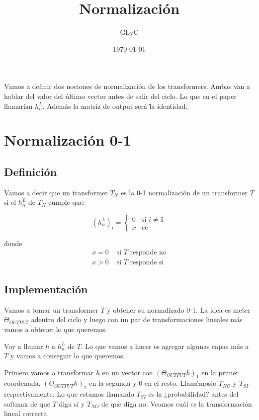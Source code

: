 \documentclass{article}
\title{Normalización}
\author{GLyC}
\date{\today}
\begin{document}
\maketitle

Vamos a definir dos nociones de normalización de los transformers. Ambas van a hablar del valor del último vector antes de salir del ciclo. Lo que en el paper llamarían $h_n^L$. Además la matriz de output será \~ la identidad.

\section*{Normalización 0-1}

\subsection*{Definición}

Vamos a decir que un transformer $T_N$ es la 0-1 normalización de un transformer $T$ si el $h_n^L$ de $T_N$ cumple que:

\begin{equation*}
(h_n^L)_i =
\begin{cases}
0 & \text{si } i \neq 1 \\
x & \text{cc }
\end{cases}
\end{equation*}

donde 
\begin{align*}
    x = 0 & \text{ si $T$ responde no} \\
    x > 0 & \text{ si $T$ responde si}
\end{align*}


\subsection*{Implementación}

Vamos a tomar un transformer $T$ y obtener su normalizado 0-1. La idea es meter $\Theta_{OUTPUT}$ adentro del ciclo y luego con un par de transformaciones lineales más vamos a obtener lo que queremos.

Voy a llamar $h$ a $h_n^L$ de $T$. Lo que vamos a hacer es agregar algunas capas más a $T$ y vamos a conseguir lo que queremos. 

Primero vamos a transformar $h$ en un vector con $(\Theta_{OUTPUT}h)_1$ en la primer coordenada, $(\Theta_{OUTPUT}h)_2$ en la segunda y 0 en el resto. Llamémoslo $T_{NO}$ y $T_{SI}$ respectivamente. Lo que estamos llamando $T_{SI}$ es la ¿probabilidad? antes del softmax de que $T$ diga sí y $T_{NO}$ de que diga no.  Veamos cuál es la transformación lineal correcta.
\end{document}

